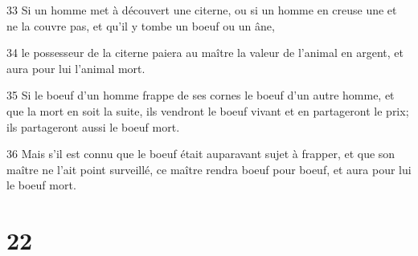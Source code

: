 \par 33 Si un homme met à découvert une citerne, ou si un homme en creuse une et ne la couvre pas, et qu'il y tombe un boeuf ou un âne,
\par 34 le possesseur de la citerne paiera au maître la valeur de l'animal en argent, et aura pour lui l'animal mort.
\par 35 Si le boeuf d'un homme frappe de ses cornes le boeuf d'un autre homme, et que la mort en soit la suite, ils vendront le boeuf vivant et en partageront le prix; ils partageront aussi le boeuf mort.
\par 36 Mais s'il est connu que le boeuf était auparavant sujet à frapper, et que son maître ne l'ait point surveillé, ce maître rendra boeuf pour boeuf, et aura pour lui le boeuf mort.

\chapter{22}

